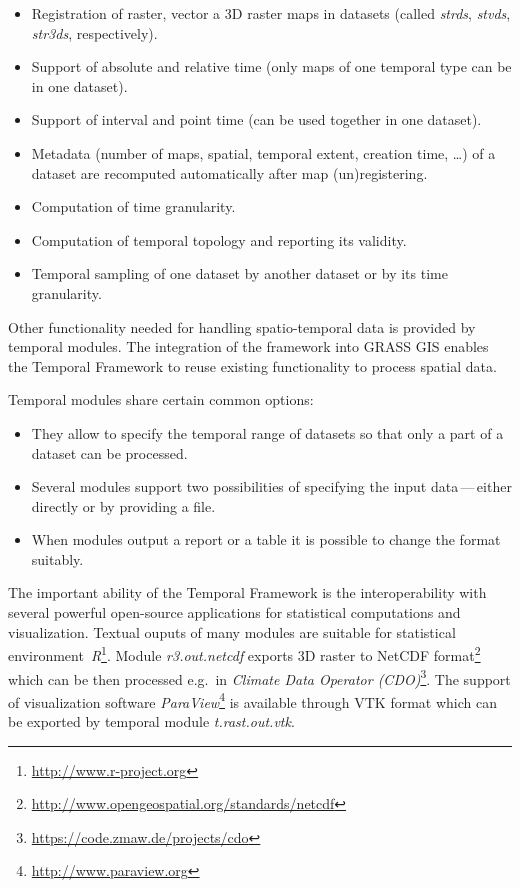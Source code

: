 \documentclass[a4paper,12pt,oneside]{book}
\newcommand{\module}[1]{\textsl{#1}}
\newcommand{\tf}{Temporal Framework\xspace}
\newcommand{\dash}{\mbox{\,---\,}}
\begin{document}
\begin{itemize}
    \item Registration of raster, vector a 3D raster maps in datasets (called \emph{strds}, \emph{stvds}, \emph{str3ds}, respectively).
    \item Support of absolute and relative time (only maps of one temporal type can be in one dataset).
    \item Support of interval and point time (can be used together in one dataset).
    \item Metadata (number of maps, spatial, temporal extent, creation time, \ldots) of a dataset
    are recomputed automatically after map (un)registering.
    \item Computation of time granularity.
    \item Computation of temporal topology and reporting its validity.
    \item Temporal sampling of one dataset by another dataset or by its time granularity.
\end{itemize}

Other functionality needed for handling spatio-temporal data is provided by temporal modules.
The integration of the framework into GRASS GIS enables the \tf to reuse existing
functionality to process spatial data.

Temporal modules share certain common options:
\begin{itemize}
  \item They allow to specify the temporal range of datasets so that only a part of a dataset can be processed.
  \item Several modules support two possibilities of specifying the input data\dash either directly or by providing a file.
  \item When modules output a report or a table it is possible to change the format suitably.
\end{itemize}

The important ability of the \tf is the interoperability
with several powerful open-source applications for statistical computations and visualization.
Textual ouputs of many modules are suitable for statistical
environment~\emph{R}\footnote{\url{http://www.r-project.org}}.
Module \module{r3.out.netcdf} exports 3D raster to NetCDF
format\footnote{\url{http://www.opengeospatial.org/standards/netcdf}}
which can be then processed e.g.\ in \emph{Climate Data Operator (CDO)}\footnote{\url{https://code.zmaw.de/projects/cdo}}.
The support of visualization software \emph{ParaView}\footnote{\url{http://www.paraview.org}} is available
through VTK format which can be exported by temporal module \module{t.rast.out.vtk}.
\end{document}
